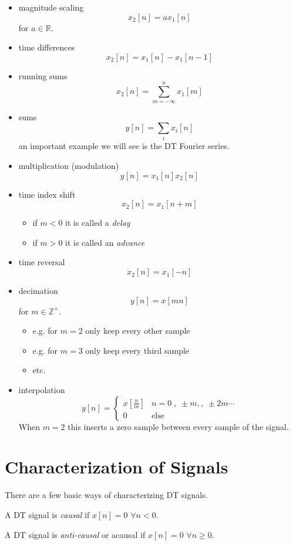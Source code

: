 \begin{itemize}
\item magnitude scaling
\[
x_2[n] = a x_1[n]
\]
for $a \in \mathbb{R}$.
\item time differences
\[
x_2[n] = x_1[n] - x_1[n-1]
\]
\item running sums
\[
x_2[n] = \sum\limits_{m = -\infty}^{n} x_1[m]
\]
\item sums
\[
y[n] = \sum\limits_{i} x_i[n]
\]
an important example we will see is the DT Fourier series.
\item multiplication (modulation)
\[
y[n] = x_1[n] x_2[n]
\]
\item time index shift
\[
x_2[n] = x_1[n+m]
\]
\begin{itemize}
\item if $m < 0$ it is called a {\it delay}
\item if $m > 0$ it is called an {\it advance}
\end{itemize}

\item time reversal
\[
x_2[n] = x_1[-n]
\]

\item decimation
\[
y[n] = x[m n]
\]
for $m \in \mathbb{Z}^+$.
\begin{itemize}
\item e.g. for $m=2$ only keep every other sample
\item e.g. for $m=3$ only keep every third sample
\item etc.
\end{itemize}

\item interpolation
\[
y[n] = \left\{  \begin{array}{cl}
x\left[ \frac{n}{m}\right] & n = 0\; , \; \pm m, , \; \pm 2m \cdots\\
0 & \mbox{else}
\end{array}\right.
\]
When $m = 2$ this inserts a zero sample between every sample of the signal.
\end{itemize}

\section{Characterization of Signals}

There are a few basic ways of characterizing DT signals.

\begin{definition}
A DT signal is \emph{causal} if $x[n] = 0$ $\forall n < 0$.
\end{definition}
\begin{definition}
A DT signal is \emph{anti-causal} or acausal if $x[n] = 0$ $\forall n \geq 0$.
\end{definition}

